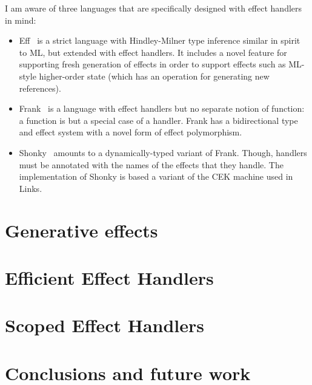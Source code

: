 \documentclass[preprint,9pt,numbers]{sigplanconf}
\begin{document}
I am aware of three languages that are specifically designed with
effect handlers in mind:

\begin{itemize}
\item Eff~\cite{BauerP15} is a strict language with Hindley-Milner
  type inference similar in spirit to ML, but extended with effect
  handlers.
%
  It includes a novel feature for supporting fresh generation of
  effects in order to support effects such as ML-style higher-order
  state (which has an operation for generating new references).

\item Frank~\cite{LindleyMM17} is a language with effect handlers but
  no separate notion of function: a function is but a special case of
  a handler. Frank has a bidirectional type and effect system with a
  novel form of effect polymorphism.
  

\item Shonky~\cite{McBride16} amounts to a dynamically-typed variant
  of Frank. Though, handlers must be annotated with the names of the
  effects that they handle. The implementation of Shonky is based a
  variant of the CEK machine used in Links.
\end{itemize}

\section{Generative effects}

\section{Efficient Effect Handlers}

\section{Scoped Effect Handlers}

\section{Conclusions and future work}

\nocite{*}

\raggedright
\end{document}
